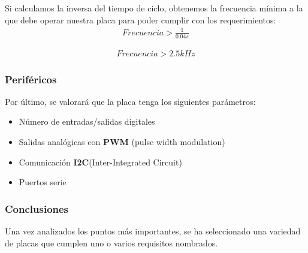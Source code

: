 Si calculamos la inversa del tiempo de ciclo, obtenemos la frecuencia mínima a la que debe operar nuestra placa para poder cumplir con los requerimientos:\\
\begin{align*}
    Frecuencia > \frac{1}{0.04s}
\end{align*}

\begin{align*}
    Frecuencia > 2.5kHz
\end{align*}

\subsubsection*{Periféricos}

Por último, se valorará que la placa tenga los siguientes parámetros:

\begin{itemize}
    \item Número de entradas/salidas digitales
    \item Salidas analógicas con \textbf{PWM} (pulse width modulation)
    \item Comunicación \textbf{I2C}(Inter-Integrated Circuit)
    \item Puertos serie
\end{itemize}



\subsubsection*{Conclusiones}

Una vez analizados los puntos más importantes, se ha seleccionado una variedad de placas que cumplen uno o varios requisitos nombrados. 

